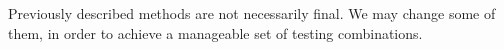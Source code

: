 \documentclass[fleqn,moreauthors,10pt]{ds_report}
\begin{document}
    Previously described methods are not necessarily final. We may change some of them, in order to achieve a manageable set of testing combinations.
    










\end{document}
